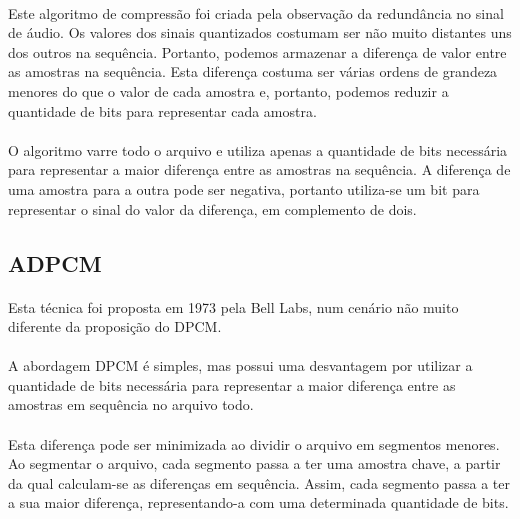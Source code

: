\documentclass[a4paper,12pt]{article}
\begin{document}
\paragraph{}
Este algoritmo de compressão foi criada pela observação da redundância no sinal de áudio. Os valores dos sinais quantizados costumam ser não muito distantes uns dos outros na sequência. Portanto, podemos armazenar a diferença de valor entre as amostras na sequência. Esta diferença costuma ser várias ordens de grandeza menores do que o valor de cada amostra e, portanto, podemos reduzir a quantidade de bits para representar cada amostra.

\paragraph{}
O algoritmo varre todo o arquivo e utiliza apenas a quantidade de bits necessária para representar a maior diferença entre as amostras na sequência. A diferença de uma amostra para a outra pode ser negativa, portanto utiliza-se um bit para representar o sinal do valor da diferença, em complemento de dois.

\subsection{ADPCM}

\paragraph{}
Esta técnica foi proposta em 1973 pela Bell Labs\cite{Cummiskey-Jayant-Flanagan-1973}, num cenário não muito diferente da proposição do DPCM.

\paragraph{}
A abordagem DPCM é simples, mas possui uma desvantagem por utilizar a quantidade de bits necessária para representar a maior diferença entre as amostras em sequência no arquivo todo.

\paragraph{}
Esta diferença pode ser minimizada ao dividir o arquivo em segmentos menores. Ao segmentar o arquivo, cada segmento passa a ter uma amostra chave, a partir da qual calculam-se as diferenças em sequência. Assim, cada segmento passa a ter a sua maior diferença, representando-a com uma determinada quantidade de bits.
\end{document}
